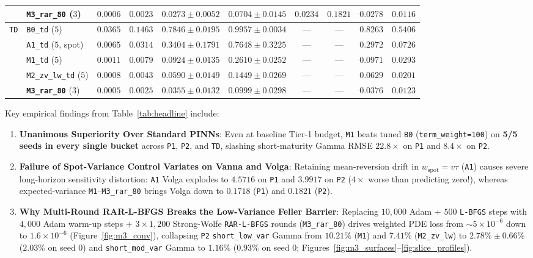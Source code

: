 \documentclass[preprint,12pt]{elsarticle}
\begin{document}
\begin{table}[htbp]
{\begin{tabular}{llcccccccc}
 & \textbf{\texttt{M3\_rar\_80}} ($3$) & $\mathbf{0.0006}$ & $\mathbf{0.0023}$ & $\mathbf{0.0273 \pm 0.0052}$ & $\mathbf{0.0704 \pm 0.0145}$ & $\mathbf{0.0234}$ & $\mathbf{0.1821}$ & $\mathbf{0.0278}$ & $\mathbf{0.0116}$ \\
\midrule
\multirow{5}{*}{\texttt{TD}}
 & \texttt{B0\_td} ($5$) & $0.0365$ & $0.1463$ & $0.7846 \pm 0.0195$ & $0.9957 \pm 0.0034$ & --- & --- & $0.8263$ & $0.5406$ \\
 & \texttt{A1\_td} ($5$, spot) & $0.0065$ & $0.0314$ & $0.3404 \pm 0.1791$ & $0.7648 \pm 0.3225$ & --- & --- & $0.2972$ & $0.0726$ \\
 & \texttt{M1\_td} ($5$) & $0.0011$ & $0.0079$ & $0.0924 \pm 0.0135$ & $0.2610 \pm 0.0252$ & --- & --- & $0.0971$ & $0.0293$ \\
 & \texttt{M2\_zv\_lw\_td} ($5$) & $0.0008$ & $0.0043$ & $0.0590 \pm 0.0149$ & $0.1449 \pm 0.0269$ & --- & --- & $0.0629$ & $0.0201$ \\
 & \textbf{\texttt{M3\_rar\_80}} ($3$) & $\mathbf{0.0005}$ & $\mathbf{0.0025}$ & $\mathbf{0.0355 \pm 0.0132}$ & $\mathbf{0.0999 \pm 0.0298}$ & --- & --- & $\mathbf{0.0376}$ & $\mathbf{0.0123}$ \\
\bottomrule
\end{tabular}}
\end{table}

Key empirical findings from Table~\ref{tab:headline} include:
\begin{enumerate}
  \item \textbf{Unanimous Superiority Over Standard PINNs}: Even at baseline Tier-1 budget, \texttt{M1} beats tuned \texttt{B0} (\texttt{term\_weight=100}) on \textbf{5/5 seeds in every single bucket} across \texttt{P1}, \texttt{P2}, and \texttt{TD}, slashing short-maturity Gamma RMSE $22.8\times$ on \texttt{P1} and $8.4\times$ on \texttt{P2}.
  \item \textbf{Failure of Spot-Variance Control Variates on Vanna and Volga}: Retaining mean-reversion drift in $w_{\mathrm{spot}} = v\tau$ (\texttt{A1}) causes severe long-horizon sensitivity distortion: \texttt{A1} Volga explodes to $4.5716$ on \texttt{P1} and $3.9917$ on \texttt{P2} ($4\times$ worse than predicting zero!), whereas expected-variance \texttt{M1}--\texttt{M3\_rar\_80} brings Volga down to $0.1718$ (\texttt{P1}) and $0.1821$ (\texttt{P2}).
  \item \textbf{Why Multi-Round RAR-L-BFGS Breaks the Low-Variance Feller Barrier}: Replacing $10{,}000$ Adam + $500$ \texttt{L-BFGS} steps with $4{,}000$ Adam warm-up steps + $3 \times 1{,}200$ Strong-Wolfe \texttt{RAR-L-BFGS} rounds (\texttt{M3\_rar\_80}) drives weighted PDE loss from $\sim 5 \times 10^{-6}$ down to $1.6 \times 10^{-6}$ (Figure~\ref{fig:m3_conv}), collapsing \texttt{P2} \texttt{short\_low\_var} Gamma from $10.21\%$ (\texttt{M1}) and $7.41\%$ (\texttt{M2\_zv\_lw}) to $\mathbf{2.78\% \pm 0.66\%}$ ($2.03\%$ on seed 0) and \texttt{short\_mod\_var} Gamma to $\mathbf{1.16\%}$ ($0.93\%$ on seed 0; Figures~\ref{fig:m3_surfaces}--\ref{fig:slice_profiles}).
\end{enumerate}
\end{document}
